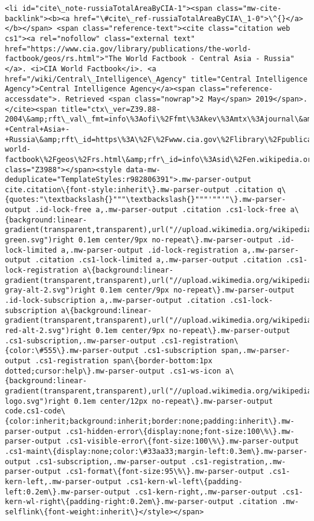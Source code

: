 \documentclass[11pt]{article}
\begin{document}
\begin{Verbatim}[commandchars=\\\{\}]
<li id="cite\_note-russiaTotalAreaByCIA-1"><span class="mw-cite-backlink"><b><a href="\#cite\_ref-russiaTotalAreaByCIA\_1-0">\^{}</a></b></span> <span class="reference-text"><cite class="citation web cs1"><a rel="nofollow" class="external text" href="https://www.cia.gov/library/publications/the-world-factbook/geos/rs.html">"The World Factbook - Central Asia - Russia"</a>. <i>CIA World Factbook</i>. <a href="/wiki/Central\_Intelligence\_Agency" title="Central Intelligence Agency">Central Intelligence Agency</a><span class="reference-accessdate">. Retrieved <span class="nowrap">2 May</span> 2019</span>.</cite><span title="ctx\_ver=Z39.88-2004\&amp;rft\_val\_fmt=info\%3Aofi\%2Ffmt\%3Akev\%3Amtx\%3Ajournal\&amp;rft.genre=unknown\&amp;rft.jtitle=CIA+World+Factbook\&amp;rft.atitle=The+World+Factbook+-+Central+Asia+-+Russia\&amp;rft\_id=https\%3A\%2F\%2Fwww.cia.gov\%2Flibrary\%2Fpublications\%2Fthe-world-factbook\%2Fgeos\%2Frs.html\&amp;rfr\_id=info\%3Asid\%2Fen.wikipedia.org\%3AList+of+Asian+countries+by+area" class="Z3988"></span><style data-mw-deduplicate="TemplateStyles:r982806391">.mw-parser-output cite.citation\{font-style:inherit\}.mw-parser-output .citation q\{quotes:"\textbackslash{}"""\textbackslash{}"""'""'"\}.mw-parser-output .id-lock-free a,.mw-parser-output .citation .cs1-lock-free a\{background:linear-gradient(transparent,transparent),url("//upload.wikimedia.org/wikipedia/commons/6/65/Lock-green.svg")right 0.1em center/9px no-repeat\}.mw-parser-output .id-lock-limited a,.mw-parser-output .id-lock-registration a,.mw-parser-output .citation .cs1-lock-limited a,.mw-parser-output .citation .cs1-lock-registration a\{background:linear-gradient(transparent,transparent),url("//upload.wikimedia.org/wikipedia/commons/d/d6/Lock-gray-alt-2.svg")right 0.1em center/9px no-repeat\}.mw-parser-output .id-lock-subscription a,.mw-parser-output .citation .cs1-lock-subscription a\{background:linear-gradient(transparent,transparent),url("//upload.wikimedia.org/wikipedia/commons/a/aa/Lock-red-alt-2.svg")right 0.1em center/9px no-repeat\}.mw-parser-output .cs1-subscription,.mw-parser-output .cs1-registration\{color:\#555\}.mw-parser-output .cs1-subscription span,.mw-parser-output .cs1-registration span\{border-bottom:1px dotted;cursor:help\}.mw-parser-output .cs1-ws-icon a\{background:linear-gradient(transparent,transparent),url("//upload.wikimedia.org/wikipedia/commons/4/4c/Wikisource-logo.svg")right 0.1em center/12px no-repeat\}.mw-parser-output code.cs1-code\{color:inherit;background:inherit;border:none;padding:inherit\}.mw-parser-output .cs1-hidden-error\{display:none;font-size:100\%\}.mw-parser-output .cs1-visible-error\{font-size:100\%\}.mw-parser-output .cs1-maint\{display:none;color:\#33aa33;margin-left:0.3em\}.mw-parser-output .cs1-subscription,.mw-parser-output .cs1-registration,.mw-parser-output .cs1-format\{font-size:95\%\}.mw-parser-output .cs1-kern-left,.mw-parser-output .cs1-kern-wl-left\{padding-left:0.2em\}.mw-parser-output .cs1-kern-right,.mw-parser-output .cs1-kern-wl-right\{padding-right:0.2em\}.mw-parser-output .citation .mw-selflink\{font-weight:inherit\}</style></span>

\end{Verbatim}
\end{document}
